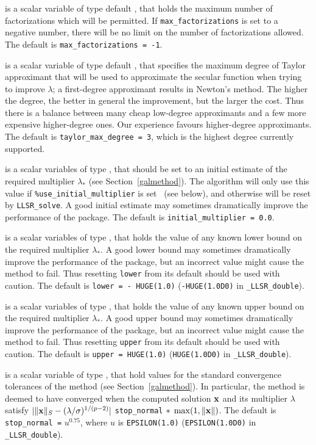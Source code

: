 \documentclass{galahad}
\newcommand{\packagename}{LLSR}
\newcommand{\fullpackagename}{\libraryname\_\packagename}
\begin{document}
\begin{description}
 is a scalar variable of type default \integer,
that holds the maximum number of factorizations which will be permitted.
If {\tt max\_factorizations} is set to a negative number, there will be
no limit on the number of factorizations allowed.
The default is {\tt max\_factorizations = -1}.

 is a scalar variable of type default \integer,
that specifies the maximum degree of Taylor approximant that will be used
to approximate the secular function when trying to improve $\lambda$;
a first-degree approximant results in Newton's method.
The higher the degree, the better in general the improvement, but the larger the
cost. Thus there is a balance between many cheap low-degree approximants
and a few more expensive higher-degree ones. Our experience favours
higher-degree approximants.
The default is {\tt taylor\_max\_degree = 3}, which is the highest degree
currently supported.

 is a scalar variables of type \realdp, that should
be set to an initial estimate of the required multiplier $\lambda_*$
(see Section~\ref{galmethod}). The algorithm will only use this value
if {\tt \%use\_initial\_multiplier} is set \true\ (see below), and otherwise
will be reset by {\tt \packagename\_solve}. A good initial estimate
may sometimes dramatically improve the performance of the package.
The default is {\tt initial\_multiplier = 0.0}.

 is a scalar variables of type \realdp, that holds the value
of any known lower bound on the required multiplier $\lambda_*$. A good lower
bound may sometimes dramatically improve the performance of the package, but
an incorrect value might cause the method to fail. Thus resetting
{\tt lower} from its default should be used with caution.
The default is {\tt lower = - HUGE(1.0)}
({\tt -HUGE(1.0D0)} in {\tt \fullpackagename\_double}).

 is a scalar variables of type \realdp, that holds the value
of any known upper bound on the required multiplier $\lambda_*$. A good upper
bound may sometimes dramatically improve the performance of the package, but
an incorrect value might cause the method to fail. Thus resetting
{\tt upper} from its default should be used with caution.
The default is {\tt upper = HUGE(1.0)}
({\tt HUGE(1.0D0)} in {\tt \fullpackagename\_double}).

 is a scalar variable of type \realdp,
that hold values for the standard convergence tolerances of the method
(see Section~\ref{galmethod}).
In particular, the method is deemed to have converged when the
computed solution ${\mathbf{x}}$ and its multiplier $\lambda$ satisfy
$|\|{\mathbf{x}}\|_S -  (\lambda/\sigma)^{1/(p-2)}|$
{\tt stop\_normal} $\ast \; \max(1,\|{\mathbf{x}}\|)$.
The default is {\tt stop\_normal =} $u^{0.75}$,
where $u$ is {\tt EPSILON(1.0)} ({\tt EPSILON(1.0D0)} in
{\tt \fullpackagename\_double}).


\end{description}
\end{document}

